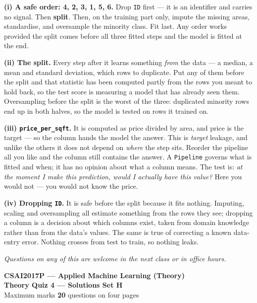 \documentclass[10pt,a4paper]{article}
\newcommand{\SetLetter}{}
\begin{document}
\textbf{(i) A safe order: 4, 2, 3, 1, 5, 6.} Drop \texttt{ID} first --- it is an identifier and carries no signal. Then \textbf{split}. Then, on the training part only, impute the missing areas, standardise, and oversample the minority class. Fit last. Any order works provided the split comes before all three fitted steps and the model is fitted at the end.\par\vspace{1mm}\textbf{(ii) The split.} Every step after it learns something \emph{from} the data --- a median, a mean and standard deviation, which rows to duplicate. Put any of them before the split and that statistic has been computed partly from the rows you meant to hold back, so the test score is measuring a model that has already seen them. Oversampling before the split is the worst of the three: duplicated minority rows end up in both halves, so the model is tested on rows it trained on.\par\vspace{1mm}\textbf{(iii) \texttt{price\_per\_sqft}.} It is computed as price divided by area, and price is the target --- so the column hands the model the answer. This is \emph{target} leakage, and unlike the others it does not depend on \emph{where} the step sits. Reorder the pipeline all you like and the column still contains the answer. A \texttt{Pipeline} governs what is fitted and when; it has no opinion about what a column means. The test is: \emph{at the moment I make this prediction, would I actually have this value?} Here you would not --- you would not know the price.\par\vspace{1mm}\textbf{(iv) Dropping \texttt{ID}.} It is safe before the split because it fits nothing. Imputing, scaling and oversampling all estimate something from the rows they see; dropping a column is a decision about which columns exist, taken from domain knowledge rather than from the data's values. The same is true of correcting a known data-entry error. Nothing crosses from test to train, so nothing leaks.

\vfill

{\footnotesize\itshape Questions on any of this are welcome in the next class or in office hours.}

\newpage


\renewcommand{\SetLetter}{H}\setcounter{page}{1}

\begin{center}
{\large\bfseries CSAI2017P --- Applied Machine Learning (Theory)}\\[2pt]
{\large\bfseries Theory Quiz 4 --- Solutions \quad\textbullet\quad Set H}\\[3pt]
{\small Maximum marks \textbf{20} \quad\textbullet{} questions on four pages}
\end{center}
\vspace{2pt}
\end{document}
